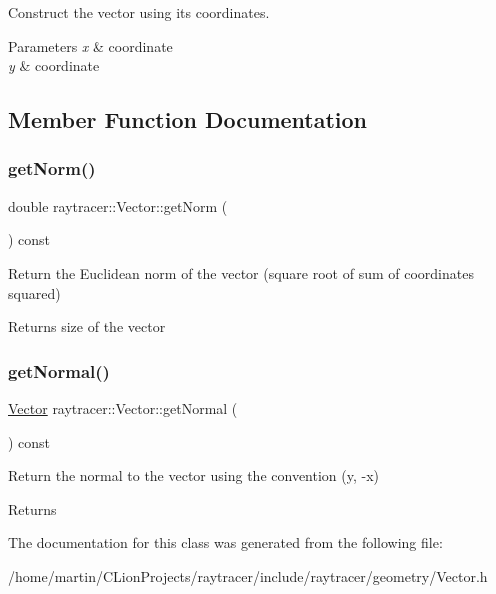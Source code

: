 Construct the vector using its coordinates. 


\begin{DoxyParams}{Parameters}
{\em x} & coordinate \\
\hline
{\em y} & coordinate \\
\hline
\end{DoxyParams}


\subsection{Member Function Documentation}
\mbox{\label{classraytracer_1_1Vector_a33106a20cb1d9c921664a7622c41cf6b}} 
\subsubsection{\texorpdfstring{get\+Norm()}{getNorm()}}
{\footnotesize\ttfamily double raytracer\+::\+Vector\+::get\+Norm (\begin{DoxyParamCaption}{ }\end{DoxyParamCaption}) const}



Return the Euclidean norm of the vector (square root of sum of coordinates squared) 

\begin{DoxyReturn}{Returns}
size of the vector 
\end{DoxyReturn}
\mbox{\label{classraytracer_1_1Vector_a21d2e5fd46c25b7e1c33fec1ecc9bd95}} 
\subsubsection{\texorpdfstring{get\+Normal()}{getNormal()}}
{\footnotesize\ttfamily \hyperlink{classraytracer_1_1Vector}{Vector} raytracer\+::\+Vector\+::get\+Normal (\begin{DoxyParamCaption}{ }\end{DoxyParamCaption}) const\hspace{0.3cm}{\ttfamily [inline]}}



Return the normal to the vector using the convention (y, -\/x) 

\begin{DoxyReturn}{Returns}

\end{DoxyReturn}


The documentation for this class was generated from the following file\+:\begin{DoxyCompactItemize}
\item 
/home/martin/\+C\+Lion\+Projects/raytracer/include/raytracer/geometry/Vector.\+h\end{DoxyCompactItemize}
